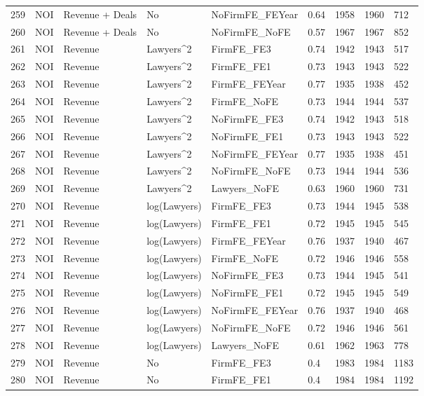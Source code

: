 \begin{table}[ht]
\begin{tabular}{rllllllll}
  259 & NOI & Revenue + Deals & No & NoFirmFE\_FEYear & 0.64 & 1958 & 1960 & 712 \\ 
  260 & NOI & Revenue + Deals & No & NoFirmFE\_NoFE & 0.57 & 1967 & 1967 & 852 \\ 
  261 & NOI & Revenue & Lawyers^2 & FirmFE\_FE3 & 0.74 & 1942 & 1943 & 517 \\ 
  262 & NOI & Revenue & Lawyers^2 & FirmFE\_FE1 & 0.73 & 1943 & 1943 & 522 \\ 
  263 & NOI & Revenue & Lawyers^2 & FirmFE\_FEYear & 0.77 & 1935 & 1938 & 452 \\ 
  264 & NOI & Revenue & Lawyers^2 & FirmFE\_NoFE & 0.73 & 1944 & 1944 & 537 \\ 
  265 & NOI & Revenue & Lawyers^2 & NoFirmFE\_FE3 & 0.74 & 1942 & 1943 & 518 \\ 
  266 & NOI & Revenue & Lawyers^2 & NoFirmFE\_FE1 & 0.73 & 1943 & 1943 & 522 \\ 
  267 & NOI & Revenue & Lawyers^2 & NoFirmFE\_FEYear & 0.77 & 1935 & 1938 & 451 \\ 
  268 & NOI & Revenue & Lawyers^2 & NoFirmFE\_NoFE & 0.73 & 1944 & 1944 & 536 \\ 
  269 & NOI & Revenue & Lawyers^2 & Lawyers\_NoFE & 0.63 & 1960 & 1960 & 731 \\ 
  270 & NOI & Revenue & log(Lawyers) & FirmFE\_FE3 & 0.73 & 1944 & 1945 & 538 \\ 
  271 & NOI & Revenue & log(Lawyers) & FirmFE\_FE1 & 0.72 & 1945 & 1945 & 545 \\ 
  272 & NOI & Revenue & log(Lawyers) & FirmFE\_FEYear & 0.76 & 1937 & 1940 & 467 \\ 
  273 & NOI & Revenue & log(Lawyers) & FirmFE\_NoFE & 0.72 & 1946 & 1946 & 558 \\ 
  274 & NOI & Revenue & log(Lawyers) & NoFirmFE\_FE3 & 0.73 & 1944 & 1945 & 541 \\ 
  275 & NOI & Revenue & log(Lawyers) & NoFirmFE\_FE1 & 0.72 & 1945 & 1945 & 549 \\ 
  276 & NOI & Revenue & log(Lawyers) & NoFirmFE\_FEYear & 0.76 & 1937 & 1940 & 468 \\ 
  277 & NOI & Revenue & log(Lawyers) & NoFirmFE\_NoFE & 0.72 & 1946 & 1946 & 561 \\ 
  278 & NOI & Revenue & log(Lawyers) & Lawyers\_NoFE & 0.61 & 1962 & 1963 & 778 \\ 
  279 & NOI & Revenue & No & FirmFE\_FE3 & 0.4 & 1983 & 1984 & 1183 \\ 
  280 & NOI & Revenue & No & FirmFE\_FE1 & 0.4 & 1984 & 1984 & 1192 \\ 
   \hline
\end{tabular}
\end{table}
